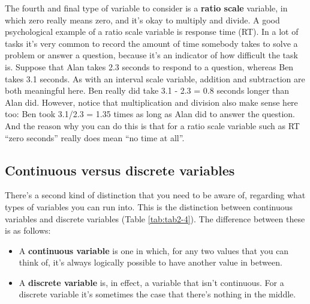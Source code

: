 \documentclass[
]{book}
\providecommand{\tightlist}{%
  \setlength{\itemsep}{0pt}\setlength{\parskip}{0pt}}
\begin{document}
The fourth and final type of variable to consider is a \textbf{ratio scale} variable, in which zero really means zero, and it's okay to multiply and divide. A good psychological example of a ratio scale variable is response time (RT). In a lot of tasks it's very common to record the amount of time somebody takes to solve a problem or answer a question, because it's an indicator of how difficult the task is. Suppose that Alan takes 2.3 seconds to respond to a question, whereas Ben takes 3.1 seconds. As with an interval scale variable, addition and subtraction are both meaningful here. Ben really did take 3.1 - 2.3 = 0.8 seconds longer than Alan did. However, notice that multiplication and division also make sense here too: Ben took 3.1/2.3 = 1.35 times as long as Alan did to answer the question. And the reason why you can do this is that for a ratio scale variable such as RT ``zero seconds'' really does mean ``no time at all''.

\hypertarget{continuous-versus-discrete-variables}{%
\subsection{Continuous versus discrete variables}\label{continuous-versus-discrete-variables}}

There's a second kind of distinction that you need to be aware of, regarding what types of variables you can run into. This is the distinction between continuous variables and discrete variables (Table \ref{tab:tab2-4}). The difference between these is as follows:

\begin{itemize}
\tightlist
\item
  A \textbf{continuous variable} is one in which, for any two values that you can think of, it's always logically possible to have another value in between.
\item
  A \textbf{discrete variable} is, in effect, a variable that isn't continuous. For a discrete variable it's sometimes the case that there's nothing in the middle.
\end{itemize}

 
  \providecommand{\huxb}[2]{\arrayrulecolor[RGB]{#1}\global\arrayrulewidth=#2pt}
  \providecommand{\huxvb}[2]{\color[RGB]{#1}\vrule width #2pt}
  \providecommand{\huxtpad}[1]{\rule{0pt}{#1}}
  \providecommand{\huxbpad}[1]{\rule[-#1]{0pt}{#1}}
\end{document}
